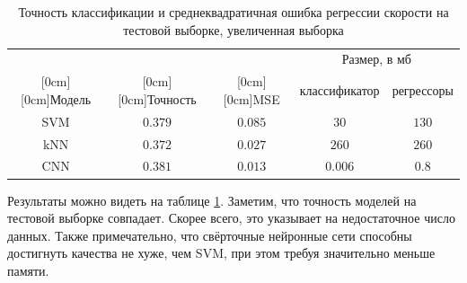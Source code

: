 \documentclass[12pt,twoside]{article}
\begin{document}
\begin{table}[H]
    \caption{Точность классификации и среднеквадратичная ошибка регрессии скорости на тестовой выборке, увеличенная выборка}
    \label{t:res}
    \begin{center}
        \begin{tabular}{|c|c|c|c|c|}
            \hline
            & & & \multicolumn{2}{c|}{Размер, в мб} \\
            \cline{4-5}
            \raisebox{1.5ex}[0cm][0cm]{Модель}
            & \raisebox{1.5ex}[0cm][0cm]{Точность}
            & \raisebox{1.5ex}[0cm][0cm]{MSE} 
            & классификатор
            & регрессоры
            \\
            \hline
            SVM
            & $0.379$ 
            & $0.085$ 
            & $30$
            & $130$
            \\
            \hline
            kNN
            & $0.372$
            & $0.027$
            & $260$
            & $260$
            \\
            \hline
            CNN
            & $0.381$
            & $0.013$
            & $0.006$
            & $0.8$
            \\
            \hline
            
        \end{tabular}
    \end{center}
\end{table}

Результаты можно видеть на таблице \ref{t:res}. Заметим, что точность моделей на тестовой выборке совпадает. Скорее всего, это указывает на недостаточное число данных. 
Также примечательно, что свёрточные нейронные сети способны достигнуть качества не хуже, чем SVM, при этом требуя значительно меньше памяти.
\end{document}
